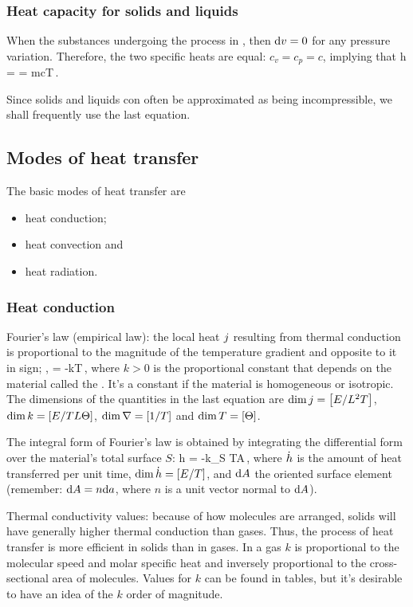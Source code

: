 \subsubsection{Heat capacity for solids and liquids}
When the substances undergoing the process in , then $\text{d} v = 0$ for any pressure variation. Therefore, the two specific heats are equal: $c_v = c_p = c$, implying that
\beq
\dt h = \dt\ien = mc\dt T\,.
\eeq

Since solids and liquids con often be approximated as being incompressible, we shall frequently use the last equation.


\subsection{Modes of heat transfer}
The basic modes of heat transfer are
\begin{itemize}
\item heat conduction;
\item heat convection and
\item heat radiation.
\end{itemize}


\subsubsection{Heat conduction}
Fourier's law (empirical law): the local heat  $j$ resulting from thermal conduction is proportional to the magnitude of the temperature gradient and opposite to it in sign; \ie,
\beq
\flux = -k\gder T\,,
\eeq
where $k > 0$ is the proportional constant that depends on the material called the . It's a constant if the material is homogeneous or isotropic. The dimensions of the quantities in the last equation are $\dim j = \left[{E/L^2T}\right]$, $\dim k = \left[{E/TL\Theta}\right]$, $\dim\nabla = \left[{1/T}\right]$ and $\dim T = \left[{\Theta}\right]$.

The integral form of Fourier's law is obtained by integrating the differential form over the material's total surface $S$:
\beq
\dt h = -k\oint_S \gder T\iprod\dx A\,,
\eeq
where $\dot{h}$ is the amount of heat transferred per unit time, $\dim\dot{h} = \left[{E/T}\right]$, and $\text{d} A$ the oriented surface element (remember: $\text{d} A = n\text{d} a$, where $n$ is a unit vector normal to $\text{d} A$).

Thermal conductivity values: because of how molecules are arranged, solids will have generally higher thermal conduction than gases. Thus, the process of heat transfer is more efficient in solids than in gases. In a gas $k$ is proportional to the molecular speed and molar specific heat and inversely proportional to the cross-sectional area of molecules. Values for $k$ can be found in tables, but it's desirable to have an idea of the $k$ order of magnitude.


